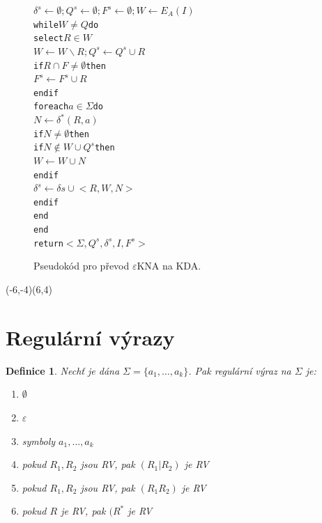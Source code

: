 \documentclass[10pt, a4paper, titlepage]{article}
\theoremstyle{note}
\newtheorem{definice}{\textbf{Definice}}
\begin{document}
\begin{figure}[h]
\begin{alltt}
\( \delta^{s} \leftarrow \emptyset; Q^{s} \leftarrow \emptyset; F^{s} \leftarrow \emptyset; W \leftarrow E_{A}(I) \)
while \( W \neq Q \) do
     select \( R \in W \)
     \( W \leftarrow W \smallsetminus {R}; Q^{s} \leftarrow Q^{s} \cup {R} \)
     if \( R \cap F \neq \emptyset \) then
         \( F^{s} \leftarrow F^{s} \cup {R} \)
     endif
     foreach \( a \in \Sigma \) do
         \( N \leftarrow \delta^{*}(R, a) \)
         if \( N \neq \emptyset \) then
             if \( N \notin W \cup Q^{s} \) then
                 \( W \leftarrow W \cup {N} \)
             endif
             \( \delta^{s} \leftarrow \delta{s} \cup {<R, W, N>} \)
         endif
     end
end
return \( <\Sigma, Q^{s}, \delta^{s}, I, F^{s}> \)
\end{alltt}
\caption{Pseudokód pro převod $\varepsilon$KNA na KDA.}
\end{figure}

\begin{center}
\begin{VCPicture}{(-6,-4)(6,4)}



\end{VCPicture}
\end{center}

\section{Regulární výrazy}

\begin{definice}
Nechť je dána $\Sigma = \lbrace a_{1}, \ldots, a_{k} \rbrace$. Pak regulární výraz na $\Sigma$ je:
\begin{enumerate}
\item
$\emptyset$

\item
$\varepsilon$

\item
symboly $a_{1}, \ldots, a_{k}$

\item
pokud $R_{1}, R_{2}$ jsou RV, pak $(R_{1}|R_{2})$ je RV

\item
pokud $R_{1}, R_{2}$ jsou RV, pak $(R_{1}R_{2})$ je RV

\item
pokud $R$ je RV, pak $(R^{*}$ je RV
\end{enumerate}
\end{definice}
\end{document}
